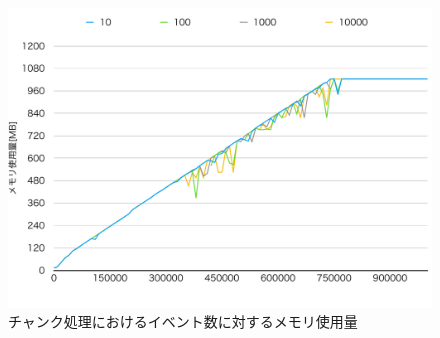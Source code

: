 \documentclass[../../../../../main]{subfiles}
\begin{document}
    \begin{figure}[H]
        \centering
        \includegraphics[width=12cm]{graph}
        \caption{チャンク処理におけるイベント数に対するメモリ使用量}
        \label{fig:chunk-mem-app_1_1024-db_1_1024}
    \end{figure}
\end{document}
